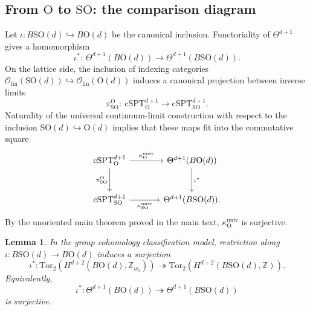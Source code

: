 \documentclass[aps,prx,reprint,superscriptaddress,twocolumn,amsmath,amssymb,amsfonts, nofootinbib]{revtex4-2}
\newcommand{\SO}{\text{SO}}
\newcommand{\tor}{\text{Tor}}
\newcommand{\Z}{\mathbb{Z}}
\theoremstyle{apsstyle}
\newtheorem{lemma}{Lemma}
\begin{document}
\subsection{From $\mathrm O$ to $\mathrm{SO}$: the comparison diagram}

Let $\iota:B\SO(d)\hookrightarrow B\mathrm{O}(d)$ be the canonical inclusion.
Functoriality of $\Theta^{d+1}$ gives a homomorphism
\begin{equation*}
\iota^{*}:\ \Theta^{d+1}(B\mathrm{O}(d))\longrightarrow \Theta^{d+1}(B\SO(d)).
\end{equation*}
On the lattice side, the inclusion of indexing categories
$\mathcal O_{\mathrm{fin}}(\SO(d))\hookrightarrow \mathcal O_{\mathrm{fin}}(\mathrm{O}(d))$ induces a canonical projection between inverse limits
\begin{equation*}
\pi^{\mathrm O}_{\mathrm{SO}}:\ \mathrm{cSPT}^{d+1}_{\mathrm O}\longrightarrow \mathrm{cSPT}^{d+1}_{\mathrm{SO}}.
\end{equation*}
Naturality of the universal continuum-limit construction with respect to the inclusion $\mathrm{SO}(d)\hookrightarrow\mathrm O(d)$ implies that these maps fit into the commutative square
\begin{equation}
\label{eq:O_to_SO_univ_square}
\begin{tikzcd}[column sep=large,row sep=large]
\mathrm{cSPT}^{d+1}_{\mathrm O} \arrow[r, "\kappa^{\mathrm{univ}}_{\mathrm O}"] \arrow[d, "\pi^{\mathrm O}_{\mathrm{SO}}"'] &
\Theta^{d+1}(B\mathrm{O}(d)) \arrow[d, "\iota^{*}"]\\
\mathrm{cSPT}^{d+1}_{\mathrm{SO}} \arrow[r, "\kappa^{\mathrm{univ}}_{\mathrm{SO}}"'] &
\Theta^{d+1}(B\SO(d)).
\end{tikzcd}
\end{equation}
By the unoriented main theorem proved in the main text, $\kappa^{\mathrm{univ}}_{\mathrm O}$ is surjective.

\bigskip 


\begin{lemma}
\label{lem:iota_surj_theta}
In the group cohomology classification model, restriction along
$\iota:B\SO(d)\to B\mathrm O(d)$ induces a surjection
\begin{equation}
\iota^*: \tor_2\left(H^{d+2}(B\mathrm O(d),\Z_{w_1}) \right)
\twoheadrightarrow \tor_2\left(H^{d+2}(B\SO(d),\Z)
\right).
\label{eq:iota_surj_assumption}
\end{equation}
Equivalently,
\begin{equation*}
\iota^*: \Theta^{d+1}(B\mathrm O(d))
\twoheadrightarrow \Theta^{d+1}(B\SO(d))
\end{equation*}
is surjective.
\end{lemma}
\end{document}

